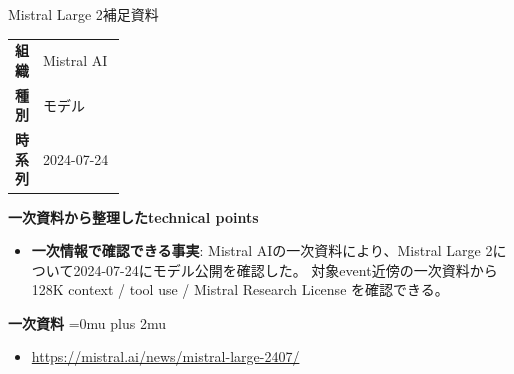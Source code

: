\begin{technicalnote}{Mistral Large 2}{補足資料}
\begingroup
\begin{tabularx}{\linewidth}{@{}>{\bfseries}p{0.22\linewidth}X@{}}
組織 & Mistral AI \\
種別 & モデル \\
時系列 & 2024-07-24 \\
\end{tabularx}
\smallskip
{\bfseries 一次資料から整理したtechnical points}
\begin{itemize}[leftmargin=1.5em,itemsep=0.35em]
\item \textbf{一次情報で確認できる事実}: Mistral AIの一次資料により、Mistral Large 2について2024-07-24にモデル公開を確認した。 対象event近傍の一次資料から 128K context / tool use / Mistral Research License を確認できる。
\end{itemize}
\begin{minipage}{\linewidth}
\begin{samepage}
{\bfseries 一次資料}
\begingroup\sloppy
\Urlmuskip=0mu plus 2mu\relax
\begin{itemize}[leftmargin=1.5em,itemsep=0.25em]
\item {\scriptsize\url{https://mistral.ai/news/mistral-large-2407/}}
\end{itemize}
\endgroup
\end{samepage}
\end{minipage}
\endgroup
\end{technicalnote}
\medskip

